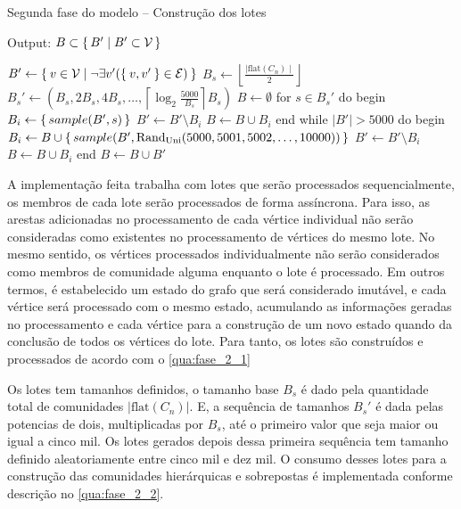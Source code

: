 \documentclass[notes.tex]{subfiles}
\begin{document}
\begin{quadro}[bhtp]
\caption{Segunda fase do modelo -- Construção dos lotes}
\label{qua:fase_2_1}
\begin{algorithm}
Output: $B \subset \set{B' | B' \subset \operatorname{\mathcal{V}}}$

$B' \leftarrow \Set{v \in \operatorname{\mathcal{V}}| \neg \exists v'(\Set{v, v'} \in \operatorname{\mathcal{E}})}$
$B_s \leftarrow  \left\lfloor  \frac{\mid \text{flat}(C_n) \mid}{2}  \right\rfloor$
$B_s' \leftarrow (B_s, 2B_s, 4B_s, \ldots , \left\lceil \log_2\frac{5000}{B_s} \right\rceil  B_s)$
$B \leftarrow \emptyset$
for $s \in B_s'$ do
begin
    $B_i \leftarrow \set{sample(B', s)}$ 
    $B' \leftarrow B' \setminus B_i$ 
    $B \leftarrow B \cup B_i$ 
end
while $|B'| > 5000$ do
begin
    $B_i \leftarrow B \cup \set{sample(B', \text{Rand}_\text{Uni}({5000, 5001, 5002, \ldots, 10000}))}$
    $B' \leftarrow B' \setminus B_i$ 
    $B \leftarrow B \cup B_i$ 
end
$B \leftarrow B \cup B'$ 
\end{algorithm}
\end{quadro}

A implementação feita trabalha com lotes que serão processados sequencialmente, os membros de cada lote serão processados de forma assíncrona.
Para isso, as arestas adicionadas no processamento de cada vértice individual não serão consideradas como existentes no processamento de vértices do mesmo lote.
No mesmo sentido, os vértices processados individualmente não serão considerados como membros de comunidade alguma enquanto o lote é processado.
Em outros termos, é estabelecido um estado do grafo que será considerado imutável, e cada vértice será processado com o mesmo estado, acumulando as informações geradas no processamento e cada vértice para a construção de um novo estado quando da conclusão de todos os vértices do lote.
Para tanto, os lotes são construídos e processados de acordo com o \autoref{qua:fase_2_1}

Os lotes tem tamanhos definidos, o tamanho base $B_s$ é dado pela quantidade total de comunidades $|\text{flat}(C_n)|$.
E, a sequência de tamanhos $B_s'$ é dada pelas potencias de dois, multiplicadas por $B_s$, até o primeiro valor que seja maior ou igual a cinco mil.
Os lotes gerados depois dessa primeira sequência tem tamanho definido aleatoriamente entre cinco mil e dez mil.
O consumo desses lotes para a construção das comunidades hierárquicas e sobrepostas é implementada conforme descrição no \autoref{qua:fase_2_2}.
\end{document}
